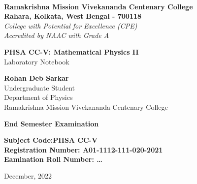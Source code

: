 \begin{titlepage}
    \begin{center}
        \\
        \large\textbf{Ramakrishna Mission Vivekananda Centenary College}\\
        \normalsize\textbf{Rahara, Kolkata, West Bengal - 700118}\\
        \small\slshape College with Potential for Excellence (CPE)\\
        \small\normalfont Accredited by NAAC with Grade A

        \vfill

        \large\textbf{PHSA CC-V: Mathematical Physics II}\\
        \normalsize Laboratory Notebook

        \vfill

        \large\textbf{Rohan Deb Sarkar}\\
        \normalsize Undergraduate Student\\
        \normalsize Department of Physics\\
        \normalsize Ramakrishna Mission Vivekananda Centenary College

        \vfill

        \large \textbf{End Semester Examination}\\

        \vspace{2em}

        \normalsize
        \textbf{Subject Code:\hfill PHSA CC-V\\
                Registration Number: \hfill A01-1112-111-020-2021\\
                Eamination Roll Number: \hfill \dots\\
        }
        
        \vfill

        \normalsize December, 2022
    \end{center}
\end{titlepage}